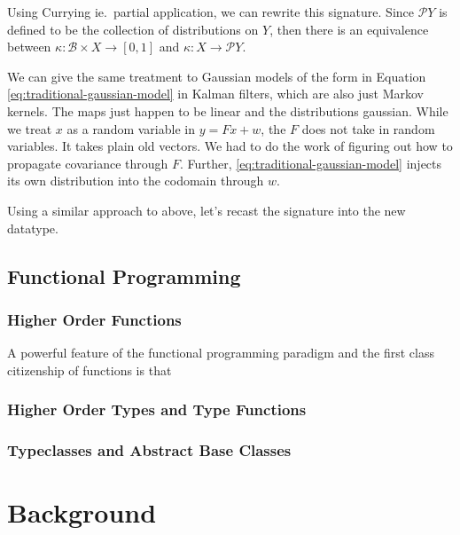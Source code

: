 \newcommand{\giry}{\mathcal{P}}
Using Currying ie.\ partial application, we can rewrite this signature. 
Since $\giry Y$ is defined to be the collection of distributions on $Y$, then there is an equivalence between $\kappa : \mathcal{B} \times X \rightarrow [0,1]$ and $\kappa : X \rightarrow \giry Y$.

We can give the same treatment to Gaussian models of the form in Equation \ref{eq:traditional-gaussian-model} in Kalman filters, which are also just Markov kernels. The maps just happen to be linear and the distributions gaussian.
While we treat $x$ as a random variable in $y = Fx + w$, the $F$ does not take in random variables.
It takes plain old vectors.
We had to do the work of figuring out how to propagate covariance through $F$.
Further, \ref{eq:traditional-gaussian-model} injects its own distribution into the codomain through $w$.


Using a similar approach to above, let's recast the signature into the new datatype.


\section{Functional Programming}
\subsection{Higher Order Functions}

A powerful feature of the functional programming paradigm and the first class citizenship of functions is that 

\subsection{Higher Order Types and Type Functions}
\subsection{Typeclasses and Abstract Base Classes}

\chapter{Background}
